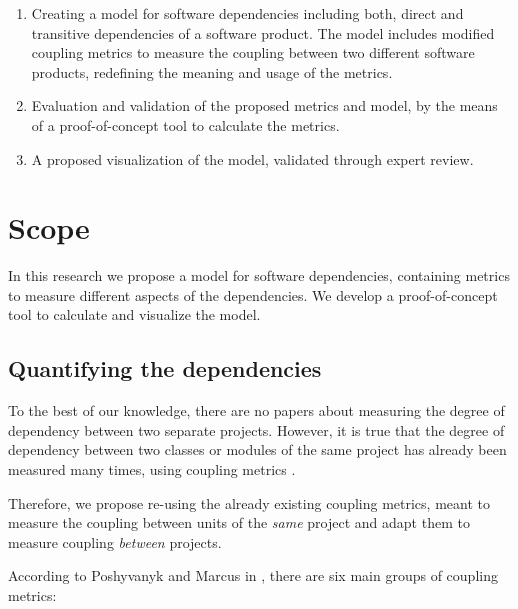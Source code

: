\begin{enumerate}
	\item Creating a model for software dependencies including both, direct and transitive dependencies of a software product. The model includes modified coupling metrics to measure the coupling between two different software products, redefining the meaning and usage of the metrics.
  \blankls

	\item Evaluation and validation of the proposed metrics and model, by the means of a proof-of-concept tool to calculate the metrics.

  \item A proposed visualization of the model, validated through expert review.
\end{enumerate}

\section{Scope}\label{section:scope}

In this research we propose a model for software dependencies, containing metrics to measure different aspects of the dependencies. We develop a proof-of-concept tool to calculate and visualize the model.

\subsection{Quantifying the dependencies}
To the best of our knowledge, there are no papers about measuring the degree of dependency between two separate projects. However, it is true that the degree of dependency between two classes or modules of the same project has already been measured many times, using coupling metrics \cite{briand1999unified}.

Therefore, we propose re-using the already existing coupling metrics, meant to measure the coupling between units of the \textit{same} project and adapt them to measure coupling \textit{between} projects.

\blankl
According to Poshyvanyk and Marcus in \cite{poshyvanyk2006conceptual}, there are six main groups of coupling metrics:

